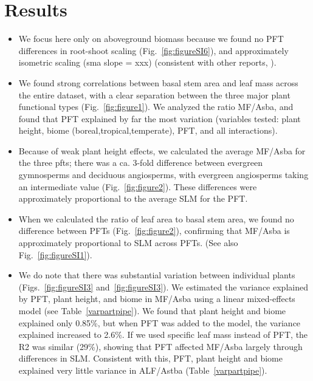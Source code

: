 \documentclass[a4paper]{article}\usepackage[]{graphicx}\usepackage[]{color}
\begin{document}
\section{Results}


\begin{itemize}

\item We focus here only on aboveground biomass because we found no PFT differences in root-shoot scaling (Fig.~\ref{fig:figureSI6}), and approximately isometric scaling (sma slope = xxx) (consistent with other reports, \cite{hui_near_2014, cairns_root_1997}).

\item We found strong correlations between basal stem area and leaf mass across the entire dataset, with a clear separation between the three major plant functional types (Fig.~\ref{fig:figure1}). We analyzed the ratio MF/Asba, and found that PFT explained by far the most variation (variables tested: plant height, biome (boreal,tropical,temperate), PFT, and all interactions).

\item Because of weak plant height effects, we calculated the average MF/Asba for the three pfts; there was a ca. 3-fold difference between evergreen gymnosperms and deciduous angiosperms, with evergreen angiosperms taking an intermediate value (Fig.~\ref{fig:figure2}). These differences were approximately proportional to the average SLM for the PFT. 

\item When we calculated the ratio of leaf area to basal stem area, we found no difference between PFTs (Fig.~\ref{fig:figure2}), confirming that MF/Asba is approximately proportional to SLM across PFTs. (See also Fig.~\ref{fig:figureSI1}).

\item We do note that there was substantial variation between individual plants (Figs.~\ref{fig:figureSI3} and~\ref{fig:figureSI3}). We estimated the variance explained by PFT, plant height, and biome in MF/Asba using a linear mixed-effects model (see Table~\ref{varpartpipe}). We found that plant height and biome explained only 0.85\%, but when PFT was added to the model, the variance explained increased to 2.6\%. If we used specific leaf mass instead of PFT, the R2 was similar (29\%), showing that PFT affected MF/Asba largely through differences in SLM. Consistent with this, PFT, plant height and biome explained very little variance in ALF/Astba (Table~\ref{varpartpipe}).


\end{itemize}
\end{document}
